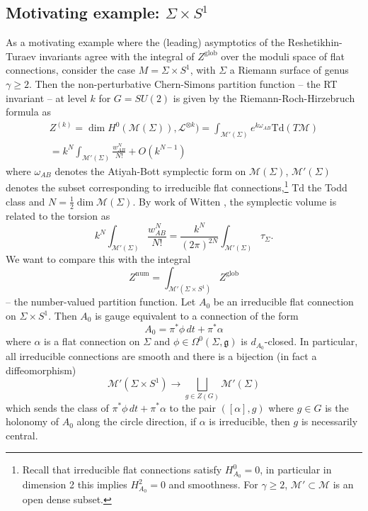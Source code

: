 \documentclass[11pt,a4paper]{amsart}
\theoremstyle{plain} %
\theoremstyle{definition}
\theoremstyle{remark}
\newcommand{\g}{\mathfrak{g}}
\newcommand{\mr}{\mathrm}
\newcommand{\M}{\mathcal{M}}
\begin{document}
\subsection{Motivating example: $\Sigma \times S^1$}\label{sec:intro example}
As a motivating example where the (leading) asymptotics of the Reshetikhin-Turaev invariants agree with the integral of $Z^\mr{glob}$ over the moduli space of flat connections, consider the case $M = \Sigma \times S^1$, with $\Sigma$ a Riemann surface of genus $\gamma \geq 2$. Then the non-perturbative Chern-Simons partition function -- the RT invariant -- at level $k$ for $G = SU(2)$ is given by the Riemann-Roch-Hirzebruch formula as %
\begin{multline} Z^{(k)} = \dim H^0(\M(\Sigma)),\mathcal{L}^{\otimes k}) = 
\int_{\M'(\Sigma)}e^{k\omega_{AB}}\mathrm{Td}  (T\M) \\ 
= k^N \int_{\M'(\Sigma)} \frac{w_{AB}^N}{N!}+O(k^{N-1}) \label{eq: intro ex 1} \end{multline}
where $\omega_{AB}$ denotes the Atiyah-Bott symplectic form on $\M(\Sigma)$, $\M'(\Sigma)$ denotes the subset corresponding to irreducible flat connections,\footnote{Recall that irreducible flat connections satisfy $H^0_{A_0} =0$, in particular in dimension 2 this implies $H^2_{A_0} =0$ and smoothness. For $\gamma \geq 2$, $\M' \subset \M$ is an open dense subset.} $\mr{Td}$ the Todd class and $N = \frac12\dim \M(\Sigma)$. By work of Witten \cite{Witten1991}, the symplectic volume is related to the torsion as \begin{equation}
     k^N \int_{\M'(\Sigma)} \frac{w_{AB}^N}{N!} = \frac{k^N}{(2\pi)^{2N}}\int_{\M'(\Sigma)}\tau_\Sigma.
     \label{eq: intro ex 3}
\end{equation}
We want to compare this with the integral 
$$ Z^\mr{num} =  \int_{\M'(\Sigma \times S^1)} Z^\mr{glob}$$
-- the number-valued partition function. 
Let $A_0$ be an irreducible flat connection on $\Sigma \times S^1$. Then $A_0$ is gauge equivalent to a connection of the form 
\begin{equation}
   A_0 = \pi^*\phi\, dt + \pi^*\alpha\label{eq: special conn}
\end{equation}
where $\alpha$ is a flat connection on $\Sigma$ and $\phi \in \Omega^0(\Sigma,\g)$ is $d_{A_0}$-closed. In particular, all irreducible connections are smooth and there is a bijection (in fact a diffeomorphism)
\begin{equation}
    \M'(\Sigma \times S^1) \to \bigsqcup_{g \in Z(G)} \M'(\Sigma)\label{eq: diffeo}
\end{equation}
which sends the class of $\pi^*\phi\, dt + \pi^*\alpha$ to the pair $([\alpha],g)$ where $g \in G$ is the holonomy of $A_0$ along the circle direction, if $\alpha$ is irreducible, then $g$ is necessarily central. 
\end{document}
